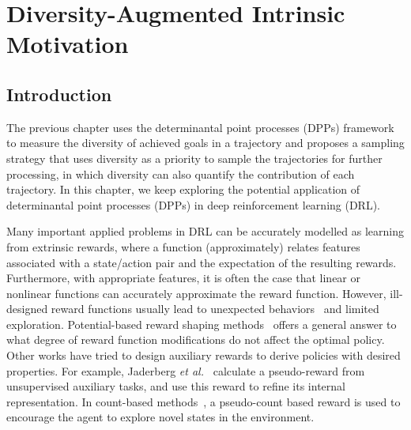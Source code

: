 \newcommand{\ourmethod}{\text{DAIM}}
\newcommand{\policypi}{\mathbf{\pi} }
\newcommand{\expection}{\mathbb{E} }
\newcommand{\tables}{{Table }}
\newcommand{\eq}{{Equation }}
\newcommand{\alg}{{Algorithm }}
\newcommand{\starcraft}{{StarCraft II}}

\chapter{Diversity-Augmented Intrinsic Motivation}
\label{ch:daim}
\section{Introduction}
The previous chapter uses the determinantal point processes (DPPs) framework to measure the diversity of achieved goals in a trajectory and proposes a sampling strategy that uses diversity as a priority to sample the trajectories for further processing, in which diversity can also quantify the contribution of each trajectory. In this chapter, we keep exploring the potential application of determinantal point processes (DPPs) in deep reinforcement learning (DRL).

Many important applied problems in DRL can be accurately modelled as learning from extrinsic rewards, where a function (approximately) relates features associated with a state/action pair and the expectation of the resulting rewards. Furthermore, with appropriate features, it is often the case that linear or nonlinear functions can accurately approximate the reward function. However, ill-designed reward functions usually lead to unexpected behaviors~\cite{riedmiller2018learning} and limited exploration. 
Potential-based reward shaping methods~\cite{ng1999policy} offers a general answer to what degree of reward function modifications do not affect the optimal policy. Other works have tried to design auxiliary rewards to derive policies with desired properties. For example, Jaderberg \textit{et al.}~\cite{jaderberg2016reinforcement} calculate a pseudo-reward from unsupervised auxiliary tasks, and use this reward to refine its internal representation. In count-based methods~\cite{bellemare2016unifying, ostrovski2017count, tang2017exploration}, a pseudo-count based reward is used to encourage the agent to explore novel states in the environment.

